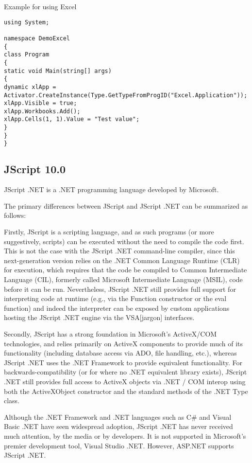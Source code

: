 \vpara
Example for using Excel

\begin{lstlisting}
using System;

namespace DemoExcel
{
class Program
{
static void Main(string[] args)
{
dynamic xlApp = Activator.CreateInstance(Type.GetTypeFromProgID("Excel.Application"));
xlApp.Visible = true;
xlApp.Workbooks.Add();
xlApp.Cells(1, 1).Value = "Test value";
}
}
}
\end{lstlisting}





\newpage
\subsection{JScript 10.0}
JScript .NET is a .NET programming language developed by Microsoft.

The primary differences between JScript and JScript .NET can be summarized as follows:

Firstly, JScript is a scripting language, and as such programs (or more suggestively, scripts) can be executed without the need to compile the code first. This is not the case with the JScript .NET command-line compiler, since this next-generation version relies on the .NET Common Language Runtime (CLR) for execution, which requires that the code be compiled to Common Intermediate Language (CIL), formerly called Microsoft Intermediate Language (MSIL), code before it can be run. Nevertheless, JScript .NET still provides full support for interpreting code at runtime (e.g., via the Function constructor or the eval function) and indeed the interpreter can be exposed by custom applications hosting the JScript .NET engine via the VSA[jargon] interfaces.

Secondly, JScript has a strong foundation in Microsoft's ActiveX/COM technologies, and relies primarily on ActiveX components to provide much of its functionality (including database access via ADO, file handling, etc.), whereas JScript .NET uses the .NET Framework to provide equivalent functionality. For backwards-compatibility (or for where no .NET equivalent library exists), JScript .NET still provides full access to ActiveX objects via .NET / COM interop using both the ActiveXObject constructor and the standard methods of the .NET Type class.

Although the .NET Framework and .NET languages such as C\# and Visual Basic .NET have seen widespread adoption, JScript .NET has never received much attention, by the media or by developers. It is not supported in Microsoft's premier development tool, Visual Studio .NET. However, ASP.NET supports JScript .NET.

